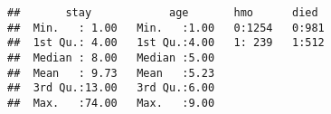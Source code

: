 \documentclass[MASTER.tex]{subfiles}
\begin{document}
\begin{frame}[fragile]
\begin{verbatim}
##       stay            age       hmo      died   
##  Min.   : 1.00   Min.   :1.00   0:1254   0:981  
##  1st Qu.: 4.00   1st Qu.:4.00   1: 239   1:512  
##  Median : 8.00   Median :5.00                   
##  Mean   : 9.73   Mean   :5.23                   
##  3rd Qu.:13.00   3rd Qu.:6.00                   
##  Max.   :74.00   Max.   :9.00
\end{verbatim}
\end{frame}
\end{document}
